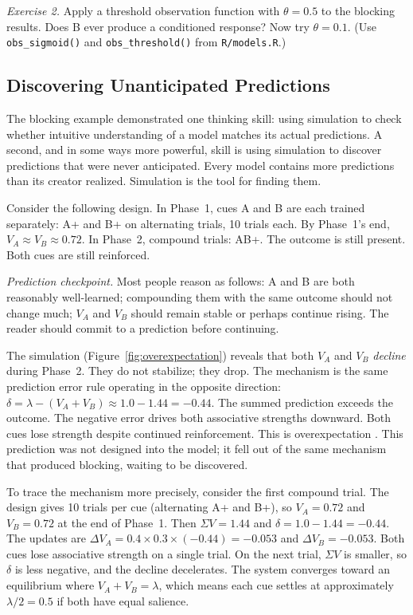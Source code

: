 \documentclass[fleqn,10pt]{wlscirep}
\begin{document}
\begin{linenumbers}
\emph{Exercise 2.} Apply a threshold observation function with $\theta = 0.5$ to the blocking results. Does B ever produce a conditioned response? Now try $\theta = 0.1$. (Use \texttt{obs\_sigmoid()} and \texttt{obs\_threshold()} from \texttt{R/models.R}.)

\subsection{Discovering Unanticipated Predictions}

The blocking example demonstrated one thinking skill: using simulation to check whether intuitive understanding of a model matches its actual predictions. A second, and in some ways more powerful, skill is using simulation to discover predictions that were never anticipated. Every model contains more predictions than its creator realized. Simulation is the tool for finding them.

Consider the following design. In Phase~1, cues A and B are each trained separately: A+ and B+ on alternating trials, 10 trials each. By Phase~1's end, $V_A \approx V_B \approx 0.72$. In Phase~2, compound trials: AB+. The outcome is still present. Both cues are still reinforced.

\emph{Prediction checkpoint.} Most people reason as follows: A and B are both reasonably well-learned; compounding them with the same outcome should not change much; $V_A$ and $V_B$ should remain stable or perhaps continue rising. The reader should commit to a prediction before continuing.

The simulation (Figure~\ref{fig:overexpectation}) reveals that both $V_A$ and $V_B$ \emph{decline} during Phase~2. They do not stabilize; they drop. The mechanism is the same prediction error rule operating in the opposite direction: $\delta = \lambda - (V_A + V_B) \approx 1.0 - 1.44 = -0.44$. The summed prediction exceeds the outcome. The negative error drives both associative strengths downward. Both cues lose strength despite continued reinforcement. This is overexpectation \citep{rescorla1970reduction, lattal1998overexpectation}. This prediction was not designed into the model; it fell out of the same mechanism that produced blocking, waiting to be discovered.

To trace the mechanism more precisely, consider the first compound trial. The design gives 10 trials per cue (alternating A+ and B+), so $V_A = 0.72$ and $V_B = 0.72$ at the end of Phase~1. Then $\Sigma V = 1.44$ and $\delta = 1.0 - 1.44 = -0.44$. The updates are $\Delta V_A = 0.4 \times 0.3 \times (-0.44) = -0.053$ and $\Delta V_B = -0.053$. Both cues lose associative strength on a single trial. On the next trial, $\Sigma V$ is smaller, so $\delta$ is less negative, and the decline decelerates. The system converges toward an equilibrium where $V_A + V_B = \lambda$, which means each cue settles at approximately $\lambda/2 = 0.5$ if both have equal salience.


\end{linenumbers}
\end{document}
